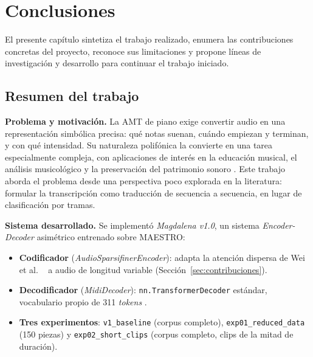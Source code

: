 
\chapter{Conclusiones}
\label{cap:conclusiones}

El presente capítulo sintetiza el trabajo realizado, enumera las
contribuciones concretas del proyecto, reconoce sus limitaciones y
propone líneas de investigación y desarrollo para continuar el trabajo
iniciado.

\section{Resumen del trabajo}
\label{sec:resumen_trabajo}

\textbf{Problema y motivación.} La AMT de piano exige convertir audio
en una representación simbólica precisa: qué notas suenan, cuándo
empiezan y terminan, y con qué intensidad. Su naturaleza polifónica la
convierte en una tarea especialmente compleja, con aplicaciones de
interés en la educación musical, el análisis musicológico y la
preservación del patrimonio sonoro
\cite{benetos2019automatic, muller2021fundamentals}. Este trabajo
aborda el problema desde una perspectiva poco explorada en la
literatura: formular la transcripción como traducción de secuencia a
secuencia, en lugar de clasificación por tramas.

\textbf{Sistema desarrollado.} Se implementó \textit{Magdalena v1.0},
un sistema \textit{Encoder-Decoder} asimétrico entrenado sobre
MAESTRO:

\begin{itemize}
    \item \textbf{Codificador} (\textit{AudioSparsifinerEncoder}):
    adapta la atención dispersa de Wei et al. \newline\
    \cite{wei2023sparsifiner} a audio de longitud variable
    (Sección~\ref{sec:contribuciones}).
    \item \textbf{Decodificador} (\textit{MidiDecoder}):
    \texttt{nn.TransformerDecoder} estándar, vocabulario propio de
    311 \textit{tokens} \cite{oore2020time}.
    \item \textbf{Tres experimentos}: \texttt{v1\_baseline} (corpus
    completo), \texttt{exp01\_reduced\_data} (150 piezas) y
    \texttt{exp02\_short\_clips} (corpus completo, clips de la mitad
    de duración).
\end{itemize}

